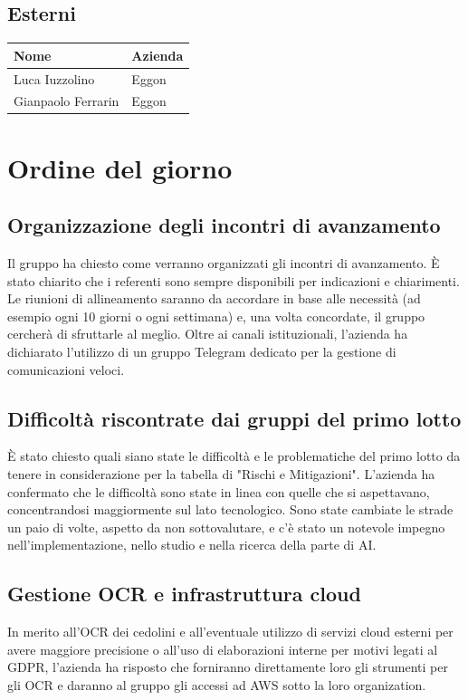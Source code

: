 \documentclass[a4paper, 10pt, colorlinks=true, linkcolor=black, urlcolor=blue, citecolor=blue, hidelinks]{article}
\begin{document}
\subsection{Esterni}

\begin{center}
\begin{tabular}{|l|l|}
\hline
\textbf{Nome} & \textbf{Azienda} \\
\hline
Luca Iuzzolino & Eggon \\
Gianpaolo Ferrarin & Eggon \\
\hline
\end{tabular}
\end{center}

\section{Ordine del giorno}

\subsection{Organizzazione degli incontri di avanzamento}
Il gruppo ha chiesto come verranno organizzati gli incontri di avanzamento. È stato chiarito che i referenti sono sempre disponibili per indicazioni e chiarimenti. Le riunioni di allineamento saranno da accordare in base alle necessità (ad esempio ogni 10 giorni o ogni settimana) e, una volta concordate, il gruppo cercherà di sfruttarle al meglio. Oltre ai canali istituzionali, l'azienda ha dichiarato l'utilizzo di un gruppo Telegram dedicato per la gestione di comunicazioni veloci.

\subsection{Difficoltà riscontrate dai gruppi del primo lotto}
È stato chiesto quali siano state le difficoltà e le problematiche del primo lotto da tenere in considerazione per la tabella di "Rischi e Mitigazioni". L'azienda ha confermato che le difficoltà sono state in linea con quelle che si aspettavano, concentrandosi maggiormente sul lato tecnologico. Sono state cambiate le strade un paio di volte, aspetto da non sottovalutare, e c'è stato un notevole impegno nell'implementazione, nello studio e nella ricerca della parte di AI.

\subsection{Gestione OCR e infrastruttura cloud}
In merito all'OCR dei cedolini e all'eventuale utilizzo di servizi cloud esterni per avere maggiore precisione o all'uso di elaborazioni interne per motivi legati al GDPR, l'azienda ha risposto che forniranno direttamente loro gli strumenti per gli OCR e daranno al gruppo gli accessi ad AWS sotto la loro organization.
\end{document}
